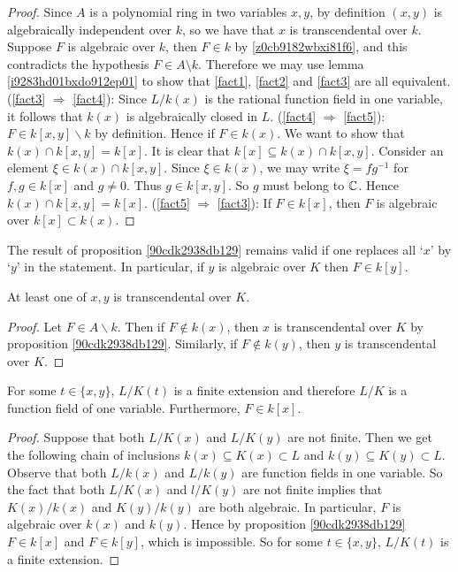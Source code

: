 \begin{proof}
	Since $A$ is a polynomial ring in two variables $x,y$, by definition $(x,y)$ 
	is algebraically independent over $ k$, so we have that $x$ is transcendental 
	over $ k$. Suppose $F$ is algebraic over $ k$, 
	then $F \in  k$ by \ref{z0cb9182wbxi81f6}, 
	and this contradicts the hypothesis $F \in A \setminus k$.
	Therefore we may use lemma \ref{i9283hd01bxdo912ep01} 
	to show that \ref{fact1}, \ref{fact2} and \ref{fact3} are all equivalent.
	(\eqref{fact3} $\Rightarrow $ \eqref{fact4}): 
	Since $L/ k(x)$ is the rational function field 
	in one variable, it follows that $ k(x)$ is algebraically closed
	in $L$.
	(\eqref{fact4} $\Rightarrow $ \eqref{fact5}): 
	$ F \in  k[x,y] \backslash  k$ by definition. 
	Hence if $F\in  k(x) $. We want to show that 
	$ k(x) \cap  k[x,y] =  k[x]$. 
	It is clear that $ k[x] \subseteq k(x) \cap  k[x,y]$.
	Consider an element $\xi \in  k(x) \cap  k[x,y]$.
	Since $\xi \in  k(x)$, we may write $\xi = fg^{-1}$ for
	$f,g\in  k[x]$ and $g \neq 0$. Thus $g \in  k[x,y]$. 
	So $g$ must belong to $\mathbb{C}$. Hence $ k(x) \cap  k[x,y] =  k[x]$.
	(\eqref{fact5} $\Rightarrow $ \eqref{fact3}):
	If $F \in  k[x]$, then $F$ is algebraic over $ k[x] \subset  k(x)$.
\end{proof}


\begin{remark}
	The result of proposition \ref{90cdk2938db129} remains valid 
	if one replaces all `$x$' by `$y$' in the statement.
	In particular, if $y$ is algebraic over $K$ then $F \in  k[y]$.
\end{remark}

\begin{corollary} \label {9fo13d912o9o0}
	At least one of $x,y$ is transcendental over $K$.
\end{corollary}

\begin{proof}
	Let $F \in A \backslash  k$. Then if $F \notin  k(x)$, then $x$ is 
	transcendental over $K$ by proposition \ref{90cdk2938db129}. Similarly, 
	if $F\notin  k(y)$, then $y$ is transcendental over $K$. 
\end{proof}

\begin{proposition}
	For some $t \in \{x,y\}$, $L/K(t)$ is a finite extension and therefore
	$L/K$ is a function field of one variable.
	Furthermore, $F \in  k[x]$.
\end{proposition}

\begin{proof}
	Suppose that both $L/K(x)$ and $L/K(y)$ are not finite. Then we get the following
	chain of inclusions $ k(x) \subseteq K(x) \subset L$ and $ k(y) \subseteq K(y) \subset L$. 
	Observe that both $L/ k(x)$ and $L/ k(y)$ are function fields in one 
	variable. So the fact that both $L/K(x)$ and $l/K(y)$ are not finite implies 
	that $K(x)/ k(x)$ and $K(y)/ k(y)$ are both algebraic. In particular,
	$F$ is algebraic over $ k(x)$ and $ k(y)$. Hence by proposition \ref{90cdk2938db129}
	$F\in  k[x]$ and $F\in  k[y]$, which is impossible. So for some $t \in \{x,y\}$, $L/K(t)$ is a finite extension.
\end{proof}

